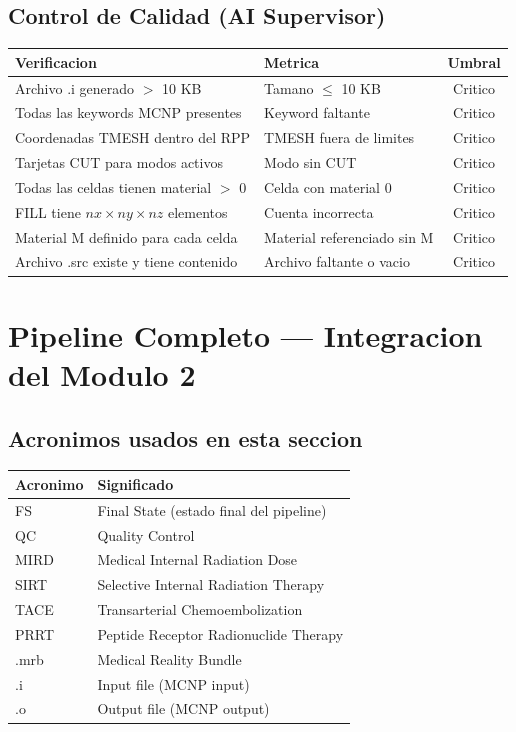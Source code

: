 \documentclass[12pt,a4paper]{article}
\begin{document}
\subsection{Control de Calidad (AI Supervisor)}

\begin{table}[H]
\centering
\begin{tabular}{llc}
\toprule
\textbf{Verificacion} & \textbf{Metrica} & \textbf{Umbral} \\
\midrule
Archivo .i generado $>$ 10 KB & Tamano $\leq$ 10 KB & Critico \\
Todas las keywords MCNP presentes & Keyword faltante & Critico \\
Coordenadas TMESH dentro del RPP & TMESH fuera de limites & Critico \\
Tarjetas CUT para modos activos & Modo sin CUT & Critico \\
Todas las celdas tienen material $>$ 0 & Celda con material 0 & Critico \\
FILL tiene $nx \times ny \times nz$ elementos & Cuenta incorrecta & Critico \\
Material M definido para cada celda & Material referenciado sin M & Critico \\
Archivo .src existe y tiene contenido & Archivo faltante o vacio & Critico \\
\bottomrule
\end{tabular}
\end{table}

\newpage

\section{Pipeline Completo --- Integracion del Modulo 2}
\label{sec:pipeline}

\subsection*{Acronimos usados en esta seccion}
\begin{tabular}{ll}
\toprule
\textbf{Acronimo} & \textbf{Significado} \\
\midrule
FS & Final State (estado final del pipeline) \\
QC & Quality Control \\
MIRD & Medical Internal Radiation Dose \\
SIRT & Selective Internal Radiation Therapy \\
TACE & Transarterial Chemoembolization \\
PRRT & Peptide Receptor Radionuclide Therapy \\
.mrb & Medical Reality Bundle \\
.i & Input file (MCNP input) \\
.o & Output file (MCNP output) \\
\bottomrule
\end{tabular}
\end{document}
